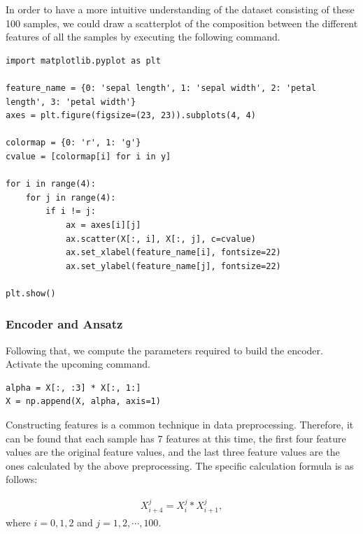 In order to have a more intuitive understanding of the dataset consisting of these 100 samples, we could draw a scatterplot of the composition between the different features of all the samples by executing the following command.

\begin{lstlisting}
import matplotlib.pyplot as plt

feature_name = {0: 'sepal length', 1: 'sepal width', 2: 'petal length', 3: 'petal width'}
axes = plt.figure(figsize=(23, 23)).subplots(4, 4)

colormap = {0: 'r', 1: 'g'}
cvalue = [colormap[i] for i in y]

for i in range(4):
    for j in range(4):
        if i != j:
            ax = axes[i][j]
            ax.scatter(X[:, i], X[:, j], c=cvalue)
            ax.set_xlabel(feature_name[i], fontsize=22)
            ax.set_ylabel(feature_name[j], fontsize=22)

plt.show()
\end{lstlisting}



\subsubsection{Encoder and Ansatz}
Following that, we compute the parameters required to build the encoder.  Activate the upcoming command.

\begin{lstlisting}
alpha = X[:, :3] * X[:, 1:]
X = np.append(X, alpha, axis=1)
\end{lstlisting}

Constructing features is a common technique in data preprocessing. Therefore, it can be found that each sample has 7 features at this time, the first four feature values are the original feature values, and the last three feature values are the ones calculated by the above preprocessing. The specific calculation formula is as follows:

\begin{eqnarray}\label{5.1dataprocessing}
    X_{i+4}^{j} = X_{i}^{j} * X_{i+1}^{j},
\end{eqnarray}
where $i = 0, 1, 2$ and $j = 1, 2, \cdots, 100$.

